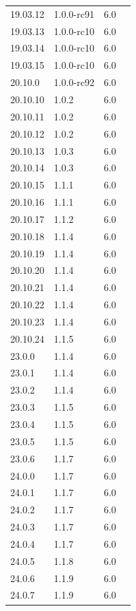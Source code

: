 \documentclass[12pt]{report}
\newcommand{\cmark}{\ding{51}} \newcommand{\xmark}{\ding{55}} \newcommand{\etal}{et~al.\ }
\begin{document}
\begin{doublespace}
{\begin{longtable}{|p{4cm}|p{3cm}||p{3cm}|p{2cm}|}
19.03.12 & 1.0.0-rc91 & 6.0 & \cmark \\
19.03.13 & 1.0.0-rc10 & 6.0 & \cmark \\
19.03.14 & 1.0.0-rc10 & 6.0 & \cmark \\
19.03.15 & 1.0.0-rc10 & 6.0 & \cmark \\
20.10.0 & 1.0.0-rc92 & 6.0 & \cmark \\
20.10.10 & 1.0.2 & 6.0 & \cmark \\
20.10.11 & 1.0.2 & 6.0 & \cmark \\
20.10.12 & 1.0.2 & 6.0 & \cmark \\
20.10.13 & 1.0.3 & 6.0 & \cmark \\
20.10.14 & 1.0.3 & 6.0 & \cmark \\
20.10.15 & 1.1.1 & 6.0 & \cmark \\
20.10.16 & 1.1.1 & 6.0 & \cmark \\
20.10.17 & 1.1.2 & 6.0 & \cmark \\
20.10.18 & 1.1.4 & 6.0 & \cmark \\
20.10.19 & 1.1.4 & 6.0 & \cmark \\
20.10.20 & 1.1.4 & 6.0 & \cmark \\
20.10.21 & 1.1.4 & 6.0 & \cmark \\
20.10.22 & 1.1.4 & 6.0 & \cmark \\
20.10.23 & 1.1.4 & 6.0 & \cmark \\
20.10.24 & 1.1.5 & 6.0 & \cmark \\
23.0.0 & 1.1.4 & 6.0 & \cmark \\
23.0.1 & 1.1.4 & 6.0 & \cmark \\
23.0.2 & 1.1.4 & 6.0 & \cmark \\
23.0.3 & 1.1.5 & 6.0 & \cmark \\
23.0.4 & 1.1.5 & 6.0 & \cmark \\
23.0.5 & 1.1.5 & 6.0 & \cmark \\
23.0.6 & 1.1.7 & 6.0 & \cmark \\
24.0.0 & 1.1.7 & 6.0 & \cmark \\
24.0.1 & 1.1.7 & 6.0 & \cmark \\
24.0.2 & 1.1.7 & 6.0 & \cmark \\
24.0.3 & 1.1.7 & 6.0 & \cmark \\
24.0.4 & 1.1.7 & 6.0 & \cmark \\
24.0.5 & 1.1.8 & 6.0 & \cmark \\
24.0.6 & 1.1.9 & 6.0 & \cmark \\
24.0.7 & 1.1.9 & 6.0 & \cmark \\

\end{longtable}}
\end{doublespace}
\end{document}
